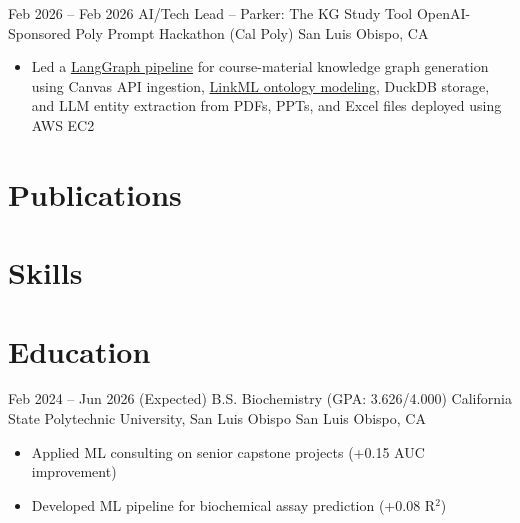 \documentclass[11pt]{moderncv}
\newcommand{\skyespace}{\vspace{8pt}}
\newcommand{\colorhref}[2]{\href{#1}{\textcolor{linkblue}{#2}}}
\begin{document}
\skyespace
\cventry
{Feb 2026 -- Feb 2026}
{AI/Tech Lead -- Parker: The KG Study Tool}
{OpenAI-Sponsored Poly Prompt Hackathon (Cal Poly)}
{San Luis Obispo, CA}
{}
{%
	\begin{itemize}
		\item Led a \colorhref{https://github.com/POLY-PROMPT-TEAM-7/backend}{LangGraph pipeline} for course-material knowledge graph generation using Canvas API ingestion, \colorhref{https://github.com/POLY-PROMPT-TEAM-7/StudyOntology}{LinkML ontology modeling}, DuckDB storage, and LLM entity extraction from PDFs, PPTs, and Excel files deployed using AWS EC2
	\end{itemize}
}
\section{Publications}
\makeatletter
\renewenvironment{thebibliography}[1]
{%
	\list{\@biblabel{\@arabic\c@enumiv}}{%
		\settowidth\labelwidth{\@biblabel{\@arabic\c@enumiv}}%
		\leftmargin\labelwidth
		\advance\leftmargin\labelsep
		\usecounter{enumiv}%
		\let\p@enumiv\@empty
		\renewcommand\theenumiv{\@arabic\c@enumiv}%
	}%
	\sloppy\clubpenalty4000\widowpenalty4000
	\sfcode`\.=\@m
}
{%
	\def\@noitemerr{\@latex@warning{Empty `thebibliography' environment}}%
	\endlist
}
\makeatother
\nocite{goetz2025mbkg, translator2025}


\section{Skills}
\section{Education}
\cventry
{Feb 2024 -- Jun 2026 (Expected)}
{B.S. Biochemistry (GPA: 3.626/4.000)}
{California State Polytechnic University, San Luis Obispo}
{San Luis Obispo, CA}
{}
{%
	\begin{itemize}[noitemsep, topsep=5pt, font=\normalsize]
		\item Applied ML consulting on senior capstone projects (+0.15 AUC improvement)
		\item Developed ML pipeline for biochemical assay prediction (+0.08 R$^2$)
	\end{itemize}
}
\end{document}

